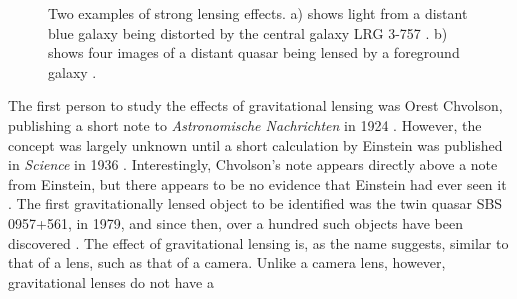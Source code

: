 \documentclass[a4paper,11pt]{article}
\begin{document}
   \begin{figure}[h]
   \centering
   \qquad
   \caption{Two examples of strong lensing effects. a) shows light from
   a distant blue galaxy being distorted by the central galaxy LRG 3-757
   \cite{einsteinring}. b) shows four images of a distant quasar being lensed by a
   foreground galaxy \cite{eincross}.}
   \label{fig:stronglens}
   \end{figure}
   The first person to study the effects of gravitational lensing was Orest
   Chvolson, publishing a short note to \emph{Astronomische Nachrichten} in 1924
   \cite{chwolsonlensing}. However, the concept was largely unknown until a
   short calculation by Einstein was published in \emph{Science} in 1936
   \cite{einsteinlensing}. Interestingly, Chvolson's note appears directly above
   a note from Einstein\cite{einsteinchwolson}, but there appears to be no
   evidence that Einstein had ever seen it \cite{renn2000eclipses}. The first
   gravitationally lensed object to be identified was the twin quasar SBS
   0957+561, in 1979, and since then, over a hundred such objects have been
   discovered \cite{firstlens,gravlenscount}. The effect of gravitational
   lensing is, as the name suggests, similar to that of a lens, such as that of
   a camera. Unlike a camera lens, however, gravitational lenses do not have a
\end{document}
